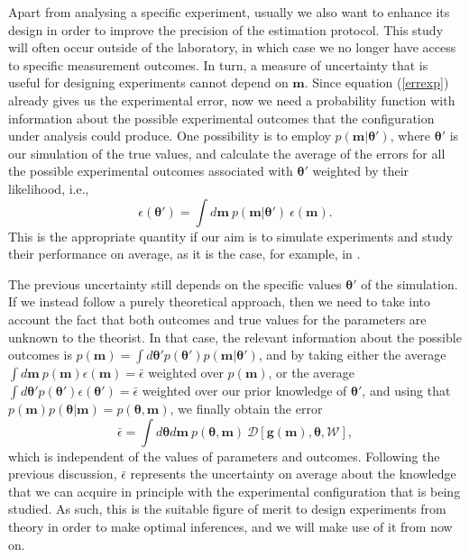 Apart from analysing a specific experiment, usually we also want to enhance its design in order to improve the precision of the estimation protocol. This study will often occur outside of the laboratory, in which case we no longer have access to specific measurement outcomes. In turn, a measure of uncertainty that is useful for designing experiments cannot depend on $\boldsymbol{m}$. Since equation (\ref{errexp}) already gives us the experimental error, now we need a probability function with information about the possible experimental outcomes that the configuration under analysis could produce. One possibility is to employ $p(\boldsymbol{m}|\boldsymbol{\theta}')$, where $\boldsymbol{\theta}'$ is our simulation of the true values, and calculate the average of the errors for all the possible experimental outcomes associated with $\boldsymbol{\theta}'$ weighted by their likelihood, i.e.,
\begin{equation}
\epsilon(\boldsymbol{\theta}') = \int d\boldsymbol{m}~p(\boldsymbol{m}|\boldsymbol{\theta}')~\epsilon(\boldsymbol{m}).
\label{errsim}
\end{equation}
This is the appropriate quantity if our aim is to simulate experiments and study their performance on average, as it is the case, for example, in \cite{PaulProctor2016}.

The previous uncertainty still depends on the specific values $\boldsymbol{\theta}'$ of the simulation. If we instead follow a purely theoretical approach, then we need to take into account the fact that both outcomes and true values for the parameters are unknown to the theorist. In that case, the relevant information about the possible outcomes is $p(\boldsymbol{m}) = \int d\boldsymbol{\theta}' p(\boldsymbol{\theta}') p(\boldsymbol{m}|\boldsymbol{\theta}')$, and by taking either the average $\int d\boldsymbol{m} ~p(\boldsymbol{m})\epsilon(\boldsymbol{m}) = \bar{\epsilon}$ weighted over $p(\boldsymbol{m})$, or the average $\int d\boldsymbol{\theta}' p(\boldsymbol{\theta}')\epsilon(\boldsymbol{\theta}') = \bar{\epsilon}$ weighted over our prior knowledge of $\boldsymbol{\theta}'$, and using that $p(\boldsymbol{m}) p(\boldsymbol{\theta}|\boldsymbol{m}) = p(\boldsymbol{\theta}, \boldsymbol{m})$, we finally obtain the error
\begin{equation}
\bar{\epsilon} = \int d\boldsymbol{\theta} d\boldsymbol{m} ~p(\boldsymbol{\theta}, \boldsymbol{m}) ~\mathcal{D}[\boldsymbol{g}(\boldsymbol{m}),\boldsymbol{\theta}, \mathcal{W}],
\label{errthe}
\end{equation}
which is independent of the values of parameters and outcomes. Following the previous discussion, $\bar{\epsilon}$ represents the uncertainty on average about the knowledge that we can acquire in principle with the experimental configuration that is being studied. As such, this is the suitable figure of merit to design experiments from theory in order to make optimal inferences, and we will make use of it from now on. 

